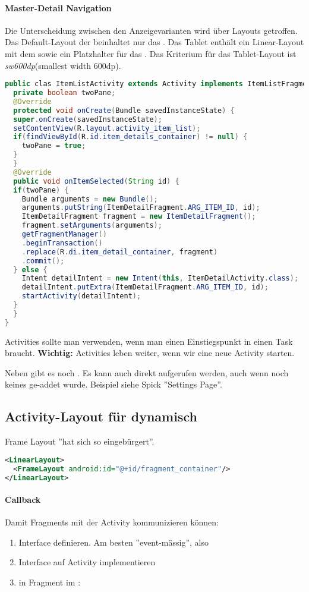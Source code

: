 \paragraph{Master-Detail Navigation} Die Unterscheidung zwischen den Anzeigevarianten wird über Layouts getroffen. Das Default-Layout der  beinhaltet nur das . Das Tablet enthält ein Linear-Layout mit dem  sowie ein Platzhalter für das . Das Kriterium für das Tablet-Layout ist \textit{sw600dp}(smallest width 600dp).
\begin{lstlisting}[language=java]
public clas ItemListActivity extends Activity implements ItemListFragment.Callbacks {
  private boolean twoPane;
  @Override
  protected void onCreate(Bundle savedInstanceState) {
  super.onCreate(savedInstanceState);
  setContentView(R.layout.activity_item_list);
  if(findViewById(R.id.item_details_container) != null) {
    twoPane = true;
  }
  }
  @Override
  public void onItemSelected(String id) {
  if(twoPane) {
    Bundle arguments = new Bundle();
    arguments.putString(ItemDetailFragment.ARG_ITEM_ID, id);
    ItemDetailFragment fragment = new ItemDetailFragment();
    fragment.setArguments(arguments);
    getFragmentManager()
    .beginTransaction()
    .replace(R.di.item_detail_container, fragment)
    .commit();
  } else {
    Intent detailIntent = new Intent(this, ItemDetailActivity.class);
    detailIntent.putExtra(ItemDetailFragment.ARG_ITEM_ID, id);
    startActivity(detailIntent);
  }
  }
}
\end{lstlisting}
Activities sollte man verwenden, wenn man einen Einstiegspunkt in einen Task braucht. \textbf{Wichtig:} Activities leben weiter, wenn wir eine neue Activity starten.

Neben  gibt es noch . Es kann auch direkt  aufgerufen werden, auch wenn noch keines ge-addet wurde. Beispiel siehe Spick ''Settings Page''.

\subsection{Activity-Layout für dynamisch}
Frame Layout ''hat sich so eingebürgert''.
\begin{lstlisting}[language=xml]
<LinearLayout>
  <FrameLayout android:id="@+id/fragment_container"/>
</LinearLayout>
\end{lstlisting}

\paragraph{Callback}
Damit Fragments mit der Activity kommunizieren können:
\begin{enumerate}
  \item Interface definieren. Am besten ''event-mässig'', also 
  \item Interface auf Activity implementieren
  \item in Fragment im :\\ 
\end{enumerate}

